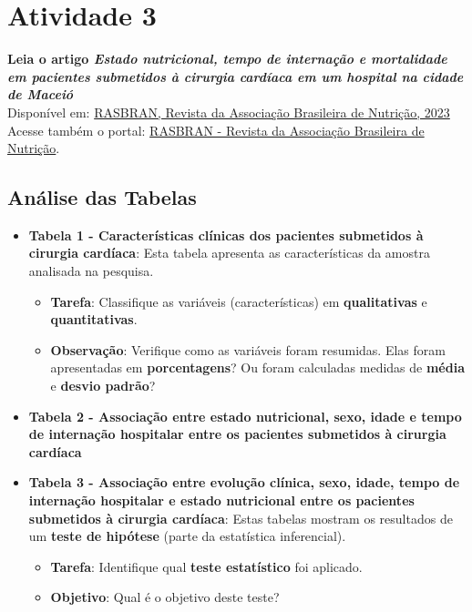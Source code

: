 \documentclass[
]{book}
\providecommand{\tightlist}{%
  \setlength{\itemsep}{0pt}\setlength{\parskip}{0pt}}
\begin{document}
\section{Atividade 3}\label{atividade-3}

\textbf{Leia o artigo \emph{Estado nutricional, tempo de internação e mortalidade em pacientes submetidos à cirurgia cardíaca em um hospital na cidade de Maceió}}\\
Disponível em: \href{https://www.rasbran.com.br/rasbran/article/view/1724/443}{RASBRAN, Revista da Associação Brasileira de Nutrição, 2023}\\
Acesse também o portal: \href{https://www.rasbran.com.br/}{RASBRAN - Revista da Associação Brasileira de Nutrição}.

\subsection{Análise das Tabelas}\label{anuxe1lise-das-tabelas}

\begin{itemize}
\tightlist
\item
  \textbf{Tabela 1 - Características clínicas dos pacientes submetidos à cirurgia cardíaca}: Esta tabela apresenta as características da amostra analisada na pesquisa.

  \begin{itemize}
  \tightlist
  \item
    \textbf{Tarefa}: Classifique as variáveis (características) em \textbf{qualitativas} e \textbf{quantitativas}.
  \item
    \textbf{Observação}: Verifique como as variáveis foram resumidas. Elas foram apresentadas em \textbf{porcentagens}? Ou foram calculadas medidas de \textbf{média} e \textbf{desvio padrão}?
  \end{itemize}
\item
  \textbf{Tabela 2 - Associação entre estado nutricional, sexo, idade e tempo de internação hospitalar entre os pacientes submetidos à cirurgia cardíaca}\\
\item
  \textbf{Tabela 3 - Associação entre evolução clínica, sexo, idade, tempo de internação hospitalar e estado nutricional entre os pacientes submetidos à cirurgia cardíaca}: Estas tabelas mostram os resultados de um \textbf{teste de hipótese} (parte da estatística inferencial).

  \begin{itemize}
  \tightlist
  \item
    \textbf{Tarefa}: Identifique qual \textbf{teste estatístico} foi aplicado.
  \item
    \textbf{Objetivo}: Qual é o objetivo deste teste?
  \end{itemize}
\end{itemize}
\end{document}
